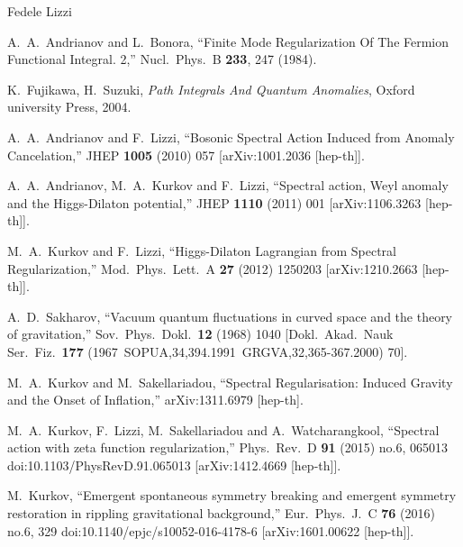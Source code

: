 \begin{artengenv}{Fedele Lizzi}
\begin{thebibliography}{99}
  A.~A.~Andrianov and L.~Bonora,
  ``Finite Mode Regularization Of The Fermion Functional Integral. 2,''
  Nucl.\ Phys.\  B {\bf 233}, 247 (1984).


 K.~Fujikawa, H.~Suzuki, {\it Path
    Integrals And Quantum Anomalies}, Oxford university Press, 2004.


  A.~A.~Andrianov and F.~Lizzi,
  ``Bosonic Spectral Action Induced from Anomaly Cancelation,''
  JHEP {\bf 1005} (2010) 057
  [arXiv:1001.2036 [hep-th]].

  A.~A.~Andrianov, M.~A.~Kurkov and F.~Lizzi,
  ``Spectral action, Weyl anomaly and the Higgs-Dilaton potential,''
  JHEP {\bf 1110} (2011) 001
  [arXiv:1106.3263 [hep-th]].
  
  M.~A.~Kurkov and F.~Lizzi,
  ``Higgs-Dilaton Lagrangian from Spectral Regularization,''
  Mod.\ Phys.\ Lett.\ A {\bf 27} (2012) 1250203
  [arXiv:1210.2663 [hep-th]].

 A.~D.~Sakharov,
  ``Vacuum quantum fluctuations in curved space and the theory of
  gravitation,''
  Sov.\ Phys.\ Dokl.\  {\bf 12} (1968) 1040
  [Dokl.\ Akad.\ Nauk Ser.\ Fiz.\  {\bf 177} (1967\ SOPUA,34,394.1991\ GRGVA,32,365-367.2000) 70].


  M.~A.~Kurkov and M.~Sakellariadou,
  ``Spectral Regularisation: Induced Gravity and the Onset of Inflation,''
  arXiv:1311.6979 [hep-th].


   M.~A.~Kurkov, F.~Lizzi, M.~Sakellariadou and A.~Watcharangkool,
  ``Spectral action with zeta function regularization,''
  Phys.\ Rev.\ D {\bf 91} (2015) no.6,  065013
  doi:10.1103/PhysRevD.91.065013
  [arXiv:1412.4669 [hep-th]].
  
M.~Kurkov,
  ``Emergent spontaneous symmetry breaking and emergent symmetry restoration in rippling gravitational background,''
  Eur.\ Phys.\ J.\ C {\bf 76} (2016) no.6,  329
  doi:10.1140/epjc/s10052-016-4178-6
  [arXiv:1601.00622 [hep-th]].


\end{thebibliography}
\end{artengenv}
